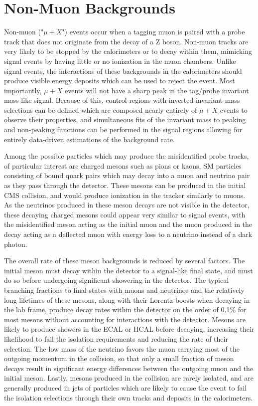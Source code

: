 \section{Non-Muon Backgrounds}
Non-muon ("$\mu+X$") events occur when a tagging muon is paired with a probe track that does not originate from the decay of a Z boson. 
Non-muon tracks are very likely to be stopped by the calorimeters or to decay within them, mimicking signal events by having little or no ionization in the muon chambers. 
Unlike signal events, the interactions of these backgrounds in the calorimeters should produce visible energy deposits which can be used to reject the event.
Most importantly, $\mu+X$ events will not have a sharp peak in the tag/probe invariant mass like signal.
Because of this, control regions with inverted invariant mass selections can be defined which are composed nearly entirely of $\mu+X$ events to observe their properties, and simultaneous fits of the invariant mass to peaking and non-peaking functions can be performed in the signal regions allowing for entirely data-driven estimations of the background rate.

Among the possible particles which may produce the misidentified probe tracks, of particular interest are charged mesons such as pions or kaons, SM particles consisting of bound quark pairs which may decay into a muon and neutrino pair as they pass through the detector.
These mesons can be produced in the initial CMS collision, and would produce ionization in the tracker similarly to muons.
As the neutrinos produced in these meson decays are not visible in the detector, these decaying charged mesons could appear very similar to signal events, with the misidentified meson acting as the initial muon and the muon produced in the decay acting as a deflected muon with energy loss to a neutrino instead of a dark photon.

The overall rate of these meson backgrounds is reduced by several factors.
The initial meson must decay within the detector to a signal-like final state, and must do so before undergoing significant showering in the detector.
The typical branching fractions to final states with muons and neutrinos and the relatively long lifetimes of these mesons, along with their Lorentz boosts when decaying in the lab frame, produce decay rates within the detector on the order of 0.1$\%$ for most mesons without accounting for interactions with the detector.
Mesons are likely to produce showers in the ECAL or HCAL before decaying, increasing their likelihood to fail the isolation requirements and reducing the rate of their selection.
The low mass of the neutrino favors the muon carrying most of the outgoing momentum in the collision, so that only a small fraction of meson decays result in significant energy differences between the outgoing muon and the initial meson.
Lastly, mesons produced in the collision are rarely isolated, and are generally produced in jets of particles which are likely to cause the event to fail the isolation selections through their own tracks and deposits in the calorimeters.

